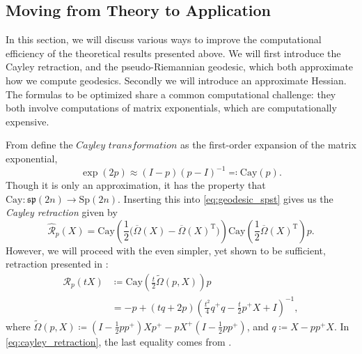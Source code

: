 \subsection{Moving from Theory to Application}%

In this section, we will discuss various ways to improve the computational efficiency of the theoretical results presented above. We will first introduce the Cayley retraction, and the pseudo-Riemannian geodesic, which both approximate how we compute geodesics. Secondly we will introduce an approximate Hessian. The formulas to be optimized share a common computational challenge: they both involve computations of matrix exponentials, which are computationally expensive. 

From \cite[p.~7]{JensenZimmermann2024} define the $\textit{Cayley transformation}$ as the first-order expansion of the matrix exponential,
%
\begin{equation*}
\exp(2p)\approx(I-p)(p-I)^{-1}\eqqcolon\mathrm{Cay}(p).
\end{equation*}
%
Though it is only an approximation, it has the property that $\mathrm{Cay}\colon\mathfrak{sp}(2n)\to \mathrm{Sp}(2n)$. Inserting this into \eqref{eq:geodesic_spst} gives us the \textit{Cayley retraction} given by
%
\begin{equation*}
\hat{\mathcal{R}}_{p}(X)=\mathrm{Cay}\left( \frac{1}{2}\big(\overline{\Omega}(X)-\overline{\Omega}(X)^{\mathrm{T}}\big) \right)\mathrm{Cay}\left( \frac{1}{2}\overline{\Omega}(X)^{\mathrm{T}} \right)p.
\end{equation*}
However, we will proceed with the even simpler, yet shown to be sufficient, retraction presented in \cite[p.~20]{BendokatZimmermann2021}:
%
\begin{equation}
    \label{eq:cayley_retraction}
    \begin{split}
        \mathcal{R}_{p}(tX)&\coloneqq\mathrm{Cay}\left( \frac{t}{2}\tilde{\Omega}(p,X) \right)p \\
        &=-p+(tq+2p)\left( \frac{t^{2}}{4}q^{+}q- \frac{t}{2}p^{+}X+I \right)^{-1},
    \end{split}
\end{equation}
%
where $\tilde{\Omega}(p,X)\coloneqq\left( I- \frac{1}{2}pp^{+} \right)Xp^{+}-pX^{+}\left( I- \frac{1}{2}pp^{+} \right)$, and $q\coloneqq X-pp^{+}X$. In \eqref{eq:cayley_retraction},  the last equality comes from \cite[Prop.~5.2]{BendokatZimmermann2021}.

